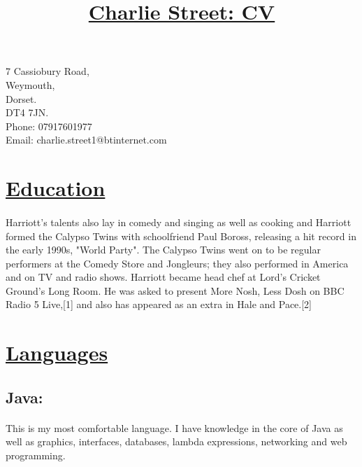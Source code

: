 \documentclass[11pt]{article}
\title{\vspace{-80pt}\underline{Charlie Street: CV}}
\date{}
\begin{document}
	\maketitle
	\begin{center}
		\vspace*{-40pt}
		\large7 Cassiobury Road,\\
		\large Weymouth,\\
		\large Dorset.\\
		\large DT4 7JN.\\	
		\large Phone: 07917601977\\
                     \large Email: charlie.street1@btinternet.com \\
	\end{center}

	
	
	\hspace{-100pt}\section*{\underline{Education}}
		\paragraph{}
			Harriott's talents also lay in comedy and singing as well as cooking and Harriott formed the Calypso Twins with schoolfriend Paul Boross, releasing a hit record in the early 1990s, "World Party". The Calypso Twins went on to be regular performers at the Comedy Store and Jongleurs; they also performed in America and on TV and radio shows. Harriott became head chef at Lord's Cricket Ground's Long Room. He was asked to present More Nosh, Less Dosh on BBC Radio 5 Live,[1] and also has appeared as an extra in Hale and Pace.[2]
	\vspace{-5pt}
	\hspace{-100pt}\section*{\underline{Languages}}
		\subsection*{Java:}
			\paragraph{}
				This is my most comfortable language. I have knowledge in the core of Java as well as graphics, interfaces, databases, lambda expressions, networking and web programming.
\end{document}
